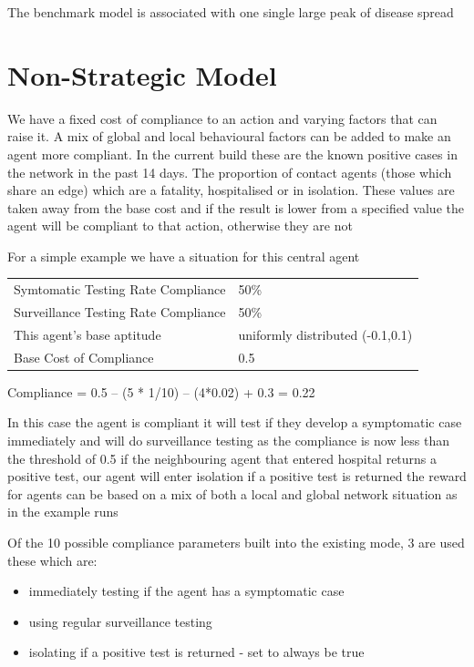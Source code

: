 \documentclass{article}
\begin{document}
The benchmark model is associated with one single large peak of disease spread

\newpage

\section{Non-Strategic Model}
We have a fixed cost of compliance to an action and varying factors that can raise it. A mix of global and local behavioural factors can be added to make an agent more compliant. In the current build these are the known positive cases in the network in the past 14 days. The proportion of contact agents (those which share an edge) which are a fatality, hospitalised or in isolation. These values are taken away from the base cost and if the result is lower from a specified value the agent will be compliant to that action, otherwise they are not

For a simple example we have a situation for this central agent 


\begin{table}[h!]
\begin{tabular}{ll}
Symtomatic Testing Rate Compliance & 50\% \\
Surveillance Testing Rate Compliance & 50\% \\
This agent’s base aptitude & uniformly distributed (-0.1,0.1) \\
Base Cost of Compliance & 0.5 
\end{tabular}
\end{table}

Compliance = 0.5 – (5 * 1/10) – (4*0.02) + 0.3 = 0.22



In this case the agent is compliant
it will test if they develop a symptomatic case immediately and will do surveillance testing as the compliance is now less than the threshold of 0.5
if the neighbouring agent that entered hospital returns a positive test, our agent will enter isolation if a positive test is returned 
the reward for agents can be based on a mix of both a local and global network situation as in the example runs

Of the 10 possible compliance parameters built into the existing mode, 3 are used these which are:
\begin{itemize}
\item immediately testing if the agent has a symptomatic case
\item using regular surveillance testing
\item isolating if a positive test is returned - set to always be true
\end{itemize}
\end{document}
